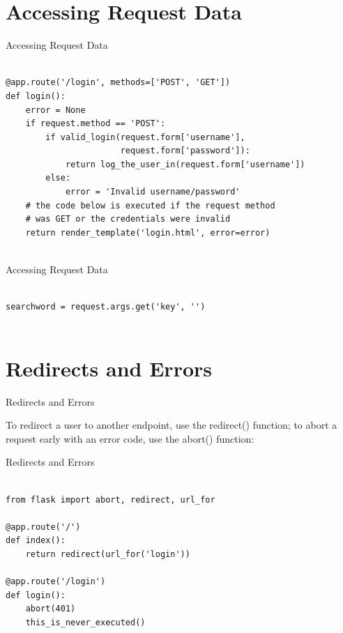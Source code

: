 \documentclass{beamer}
\begin{document}
\section{Accessing Request Data}


\begin{frame}[t,fragile]{Accessing Request Data}


\begin{verbatim}

@app.route('/login', methods=['POST', 'GET'])
def login():
    error = None
    if request.method == 'POST':
        if valid_login(request.form['username'],
                       request.form['password']):
            return log_the_user_in(request.form['username'])
        else:
            error = 'Invalid username/password'
    # the code below is executed if the request method
    # was GET or the credentials were invalid
    return render_template('login.html', error=error)


\end{verbatim}


\end{frame}

\begin{frame}[t,fragile]{Accessing Request Data}


\begin{verbatim}

searchword = request.args.get('key', '')


\end{verbatim}


\end{frame}


\section{Redirects and Errors}

\begin{frame}[t]{Redirects and Errors}

To redirect a user to another endpoint, use the redirect()
function; to abort a request early with an error code, use the
abort() function:

\end{frame}


\begin{frame}[t,fragile]{Redirects and Errors}


\begin{verbatim}

from flask import abort, redirect, url_for

@app.route('/')
def index():
    return redirect(url_for('login'))

@app.route('/login')
def login():
    abort(401)
    this_is_never_executed()


\end{verbatim}


\end{frame}
\end{document}
